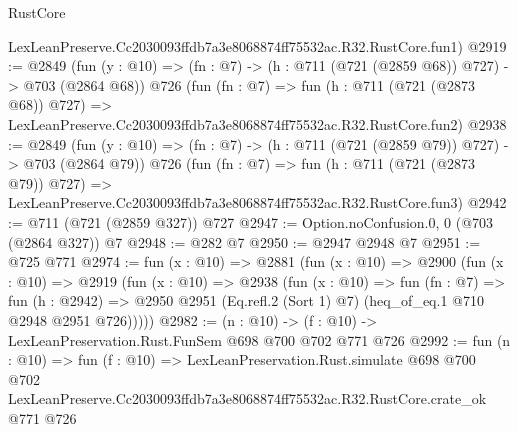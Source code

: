\begin{lexlean}{RustCore}
\begin{coremodule}
    LexLeanPreserve.Cc2030093ffdb7a3e8068874ff75532ac.R32.RustCore.fun1)
@2919 := @2849
    (fun (y : @10) => (fn : @7) -> (h : @711 (@721 (@2859 @68)) @727) -> @703 (@2864 @68))
    @726
    (fun (fn : @7) =>
    fun (h : @711 (@721 (@2873 @68)) @727) =>
    LexLeanPreserve.Cc2030093ffdb7a3e8068874ff75532ac.R32.RustCore.fun2)
@2938 := @2849
    (fun (y : @10) => (fn : @7) -> (h : @711 (@721 (@2859 @79)) @727) -> @703 (@2864 @79))
    @726
    (fun (fn : @7) =>
    fun (h : @711 (@721 (@2873 @79)) @727) =>
    LexLeanPreserve.Cc2030093ffdb7a3e8068874ff75532ac.R32.RustCore.fun3)
@2942 := @711 (@721 (@2859 @327)) @727
@2947 := Option.noConfusion.{0, 0} (@703 (@2864 @327)) @7
@2948 := @282 @7
@2950 := @2947 @2948 @7
@2951 := @725 @771
@2974 := fun (x : @10) =>
  @2881
    (fun (x : @10) =>
    @2900
      (fun (x : @10) =>
      @2919
        (fun (x : @10) =>
        @2938
          (fun (x : @10) =>
          fun (fn : @7) =>
          fun (h : @2942) =>
          @2950 @2951 (Eq.refl.{2} (Sort 1) @7) (heq_of_eq.{1} @710 @2948 @2951 @726)))))
@2982 := (n : @10) -> (f : @10) -> LexLeanPreservation.Rust.FunSem @698 @700 @702 @771 @726
@2992 := fun (n : @10) =>
  fun (f : @10) =>
  LexLeanPreservation.Rust.simulate
    @698
    @700
    @702
    LexLeanPreserve.Cc2030093ffdb7a3e8068874ff75532ac.R32.RustCore.crate_ok
    @771
    @726
\end{coremodule}
\end{lexlean}
